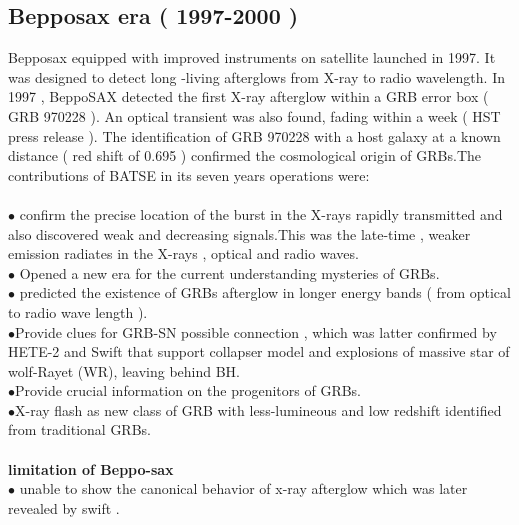 \subsection{Bepposax era ( 1997-2000 )}
Bepposax  equipped  with  improved  instruments  on satellite launched in 1997. It was designed to detect long -living  afterglows from X-ray to  radio  wavelength.  In 1997 , BeppoSAX  detected the first X-ray  afterglow  within  a GRB  error box  ( GRB 970228 ). An  optical  transient  was  also  found, fading  within  a week ( HST press release ). The  identification  of  GRB 970228  with  a host galaxy  at a known distance ( red  shift  of  0.695 ) confirmed  the  cosmological  origin  of GRBs.The contributions  of  BATSE  in  its  seven  years  operations  were:\\\\
$\bullet$ confirm  the  precise  location  of  the  burst  in  the  X-rays  rapidly transmitted  and  also  discovered  weak and  decreasing  signals.This  was  the late-time ,  weaker  emission  radiates  in  the  X-rays , optical  and  radio  waves.\\
$\bullet$ Opened  a new  era  for  the  current  understanding  mysteries  of GRBs.\\
$\bullet$ predicted  the  existence  of  GRBs  afterglow  in  longer  energy  bands ( from  optical  to  radio  wave  length ).\\
$\bullet$Provide  clues  for  GRB-SN  possible  connection , which  was  latter confirmed  by  HETE-2  and  Swift  that  support  collapser  model  and  explosions of  massive  star  of  wolf-Rayet  (WR), leaving  behind  BH.\\
$\bullet$Provide  crucial  information  on  the  progenitors  of  GRBs.\\
$\bullet$X-ray  flash  as  new  class  of  GRB  with  less-lumineous  and  low redshift  identified  from  traditional  GRBs.\citep{4 , 7}\\\\
\textbf{limitation of Beppo-sax}\\
$\bullet$ unable to show the canonical behavior of x-ray afterglow which was later revealed by swift .\citep{5}
